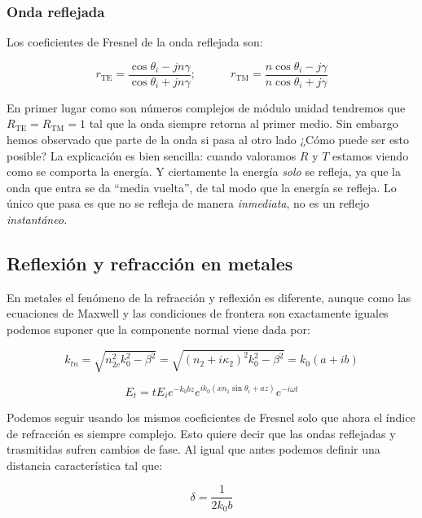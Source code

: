 \documentclass[12pt,a4paper]{article}
\newcommand{\tquad}{\quad \quad \quad}
\newcommand{\TE}{\mathrm{TE}}
\newcommand{\TM}{\mathrm{TM}}
\numberwithin{equation}{section}
\numberwithin{figure}{section}
\begin{document}
\subsubsection{Onda reflejada}

Los coeficientes de Fresnel de la onda reflejada son:

\begin{equation}
r_{\TE} = \dfrac{\cos \theta_i - j n \gamma}{\cos \theta_i + j n \gamma}; \tquad r_{\TM} = \dfrac{n \cos \theta_i - j \gamma}{n \cos \theta_i + j \gamma}
\end{equation}

En primer lugar como son números complejos de módulo unidad tendremos que $R_{\TE} = R_{\TM}=1$ tal que la onda siempre retorna al primer medio. Sin embargo hemos observado que parte de la onda si pasa al otro lado ¿Cómo puede ser esto posible? La explicación es bien sencilla: cuando valoramos $R$ y $T$ estamos viendo como se comporta la energía. Y ciertamente la energía \textit{solo} se refleja, ya que la onda que entra se da ``media vuelta'', de tal modo que la energía se refleja. Lo único que pasa es que no se refleja de manera \textit{inmediata}, no es un reflejo \textit{instantáneo.}


\subsection{Reflexión y refracción en metales}

En metales el fenómeno de la refracción y reflexión es diferente, aunque como  las ecuaciones de Maxwell y las condiciones de frontera son exactamente iguales podemos suponer que la componente normal viene dada por:

\begin{equation}
k_{tn} = \sqrt{n_{2c}^2 k_0^2 - \beta^2} = \sqrt{(n_2 + i \kappa_2)^2 k_0^2 - \beta^2} = k_0 (a + ib)
\end{equation}

\begin{equation}
E_t = t E_i e^{-k_0 b z} e^{i k_0 (x n_1 \sin \theta_i + a z )} e^{- i \omega t}
\end{equation}

Podemos seguir usando los mismos coeficientes de Fresnel solo que ahora el índice de refracción es siempre complejo. Esto quiere decir que las ondas reflejadas y trasmitidas sufren cambios de fase. Al igual que antes podemos definir una distancia característica tal que:

\begin{equation}
\delta = \dfrac{1}{2 k_0 b}
\end{equation}
\end{document}
